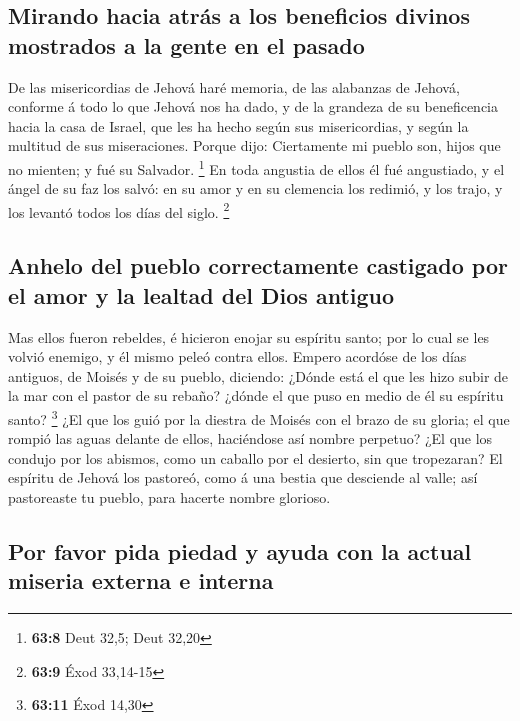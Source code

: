 \hypertarget{mirando-hacia-atruxe1s-a-los-beneficios-divinos-mostrados-a-la-gente-en-el-pasado}{%
\subsection{Mirando hacia atrás a los beneficios divinos mostrados a la
gente en el
pasado}\label{mirando-hacia-atruxe1s-a-los-beneficios-divinos-mostrados-a-la-gente-en-el-pasado}}

 De las misericordias de Jehová haré memoria, de las
alabanzas de Jehová, conforme á todo lo que Jehová nos ha dado, y de la
grandeza de su beneficencia hacia la casa de Israel, que les ha hecho
según sus misericordias, y según la multitud de sus miseraciones.
 Porque dijo: Ciertamente mi pueblo son, hijos que no
mienten; y fué su Salvador. \footnote{\textbf{63:8} Deut 32,5; Deut
  32,20}  En toda angustia de ellos él fué angustiado, y el
ángel de su faz los salvó: en su amor y en su clemencia los redimió, y
los trajo, y los levantó todos los días del siglo. \footnote{\textbf{63:9}
  Éxod 33,14-15}

\hypertarget{anhelo-del-pueblo-correctamente-castigado-por-el-amor-y-la-lealtad-del-dios-antiguo}{%
\subsection{Anhelo del pueblo correctamente castigado por el amor y la
lealtad del Dios
antiguo}\label{anhelo-del-pueblo-correctamente-castigado-por-el-amor-y-la-lealtad-del-dios-antiguo}}

 Mas ellos fueron rebeldes, é hicieron enojar su espíritu
santo; por lo cual se les volvió enemigo, y él mismo peleó contra ellos.
 Empero acordóse de los días antiguos, de Moisés y de su
pueblo, diciendo: ¿Dónde está el que les hizo subir de la mar con el
pastor de su rebaño? ¿dónde el que puso en medio de él su espíritu
santo? \footnote{\textbf{63:11} Éxod 14,30}  ¿El que los
guió por la diestra de Moisés con el brazo de su gloria; el que rompió
las aguas delante de ellos, haciéndose así nombre perpetuo?
 ¿El que los condujo por los abismos, como un caballo por
el desierto, sin que tropezaran?  El espíritu de Jehová los
pastoreó, como á una bestia que desciende al valle; así pastoreaste tu
pueblo, para hacerte nombre glorioso.

\hypertarget{por-favor-pida-piedad-y-ayuda-con-la-actual-miseria-externa-e-interna}{%
\subsection{Por favor pida piedad y ayuda con la actual miseria externa
e
interna}\label{por-favor-pida-piedad-y-ayuda-con-la-actual-miseria-externa-e-interna}}


